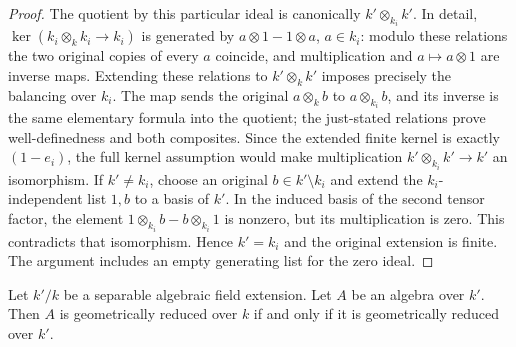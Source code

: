 \begin{proof}
The quotient by this particular ideal is
canonically $k'\otimes_{k_i}k'$. In detail,
$\ker(k_i\otimes_kk_i\to k_i)$ is generated
by $a\otimes1-1\otimes a$, $a\in k_i$:
modulo these relations the two original
copies of every $a$ coincide, and multiplication
and $a\mapsto a\otimes1$ are inverse maps.
Extending these relations to $k'\otimes_kk'$
imposes precisely the balancing over $k_i$.
The map sends the original $a\otimes_k b$
to $a\otimes_{k_i}b$, and its inverse is
the same elementary formula into the
quotient; the just-stated relations prove
well-definedness and both composites.
Since the extended finite kernel is exactly
$(1-e_i)$, the full kernel assumption would
make multiplication
$k'\otimes_{k_i}k'\to k'$ an isomorphism.
If $k'\ne k_i$, choose an original
$b\in k'\setminus k_i$ and extend the
$k_i$-independent list $1,b$ to a basis
of $k'$. In the induced basis of the
second tensor factor, the element
$1\otimes_{k_i}b-b\otimes_{k_i}1$ is nonzero,
but its multiplication is zero. This
contradicts that isomorphism. Hence
$k'=k_i$ and the original extension is
finite. The argument includes an empty
generating list for the zero ideal.
\end{proof}

\begin{lemma}
\label{editorial-source-lemma-geometrically-reduced-over-separable-algebraic}
Let $k'/k$ be a separable algebraic field extension.
Let $A$ be an algebra over $k'$. Then $A$ is geometrically
reduced over $k$ if and only if it is geometrically reduced over $k'$.
\end{lemma}

